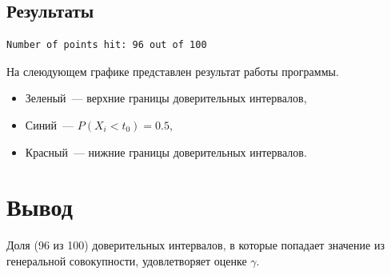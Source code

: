 \documentclass{article}
\begin{document}
        \subsection{Результаты}
\begin{verbatim}
Number of points hit: 96 out of 100
\end{verbatim}
            На слеюдующем графике представлен результат работы программы.
            \begin{figure}[h]
    	    \end{figure}
            \begin{itemize}
                \item Зеленый~--- верхние границы доверительных интервалов,
                \item Синий~--- $P(X_i < t_0) = 0.5$,
                \item Красный~--- нижние границы доверительных интервалов.
            \end{itemize}
    \section{Вывод}
        Доля (96 из 100) доверительных интервалов, в которые попадает значение из генеральной совокупности, удовлетворяет оценке $\gamma$.
\end{document}
